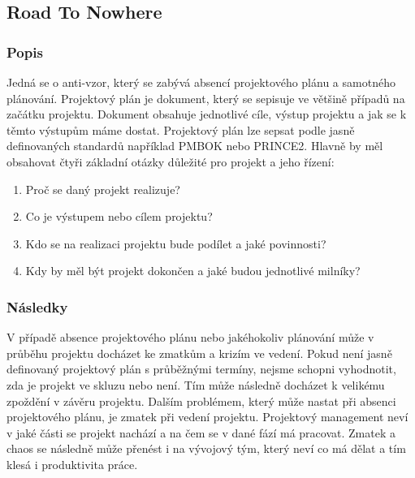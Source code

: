 \documentclass[czech,DP]{thesiskiv}
\begin{document}
\subsection{Road To Nowhere}
\subsubsection{Popis}
Jedná se o anti-vzor, který se zabývá absencí projektového plánu a samotného plánování. \cite{antipatterns2} Projektový plán je dokument, který se sepisuje ve většině případů na začátku projektu. Dokument obsahuje jednotlivé cíle, výstup projektu a jak se k těmto výstupům máme dostat. Projektový plán lze sepsat podle jasně definovaných standardů například PMBOK nebo PRINCE2. Hlavně by měl obsahovat čtyři základní otázky důležité pro projekt a jeho řízení:
\begin{enumerate}
    \item Proč se daný projekt realizuje?
    \item Co je výstupem nebo cílem projektu?
    \item Kdo se na realizaci projektu bude podílet a jaké povinnosti?
    \item Kdy by měl být projekt dokončen a jaké budou jednotlivé milníky? \cite{project_plan}
\end{enumerate}
\subsubsection{Následky}
V případě absence projektového plánu nebo jakéhokoliv plánování může v průběhu projektu docházet ke zmatkům a krizím ve vedení. Pokud není jasně definovaný projektový plán s průběžnými termíny, nejsme schopni vyhodnotit, zda je projekt ve skluzu nebo není. Tím může následně docházet k velikému zpoždění v závěru projektu. Dalším problémem, který může nastat při absenci projektového plánu, je zmatek při vedení projektu. Projektový management neví v jaké části se projekt nachází a na čem se v dané fází má pracovat. Zmatek a chaos se následně může přenést i na vývojový tým, který neví co má dělat a tím klesá i produktivita práce. \cite{antipatterns2}
\end{document}
